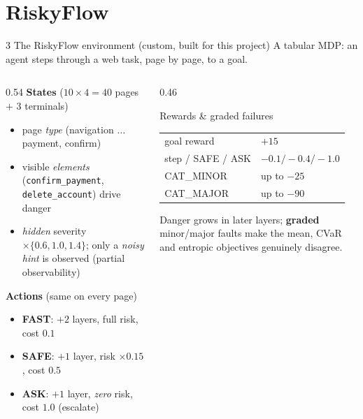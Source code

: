 \documentclass[aspectratio=169,11pt]{beamer}
\begin{document}
\section{RiskyFlow}
\begin{frame}{3 \quad The RiskyFlow environment (custom, built for this project)}
  A tabular MDP: an agent steps through a web task, page by page, to a goal.
  \begin{columns}
  \begin{column}{0.54\textwidth}
  \textbf{States} ($10\times4=40$ pages $+$ 3 terminals)
  \begin{itemize}\footnotesize
    \item page \emph{type} (navigation $\ldots$ payment, confirm)
    \item visible \emph{elements} (\texttt{confirm\_payment}, \texttt{delete\_account}) drive danger
    \item \emph{hidden} severity $\times\{0.6,1.0,1.4\}$; only a \emph{noisy hint} is observed
          (partial observability)
  \end{itemize}
  \textbf{Actions} (same on every page)
  \begin{itemize}\footnotesize
    \item \textcolor{jevteal}{\textbf{FAST}}: $+2$ layers, full risk, cost $0.1$
    \item \textcolor{amber}{\textbf{SAFE}}: $+1$ layer, risk $\times0.15$, cost $0.5$
    \item \textbf{ASK}: $+1$ layer, \emph{zero} risk, cost $1.0$ (escalate)
  \end{itemize}
  \end{column}
  \begin{column}{0.46\textwidth}
  \begin{block}{Rewards \& graded failures}
  \footnotesize
  \begin{tabular}{@{}ll@{}}
    goal reward & $+15$\\
    step / SAFE / ASK & $-0.1 / -0.4 / -1.0$\\
    \textcolor{amber}{CAT\_MINOR} & up to $-25$\\
    \textcolor{bad}{CAT\_MAJOR} & up to $-90$\\
  \end{tabular}
  \vspace{1mm}
  \par Danger grows in later layers; \textbf{graded} minor/major faults make the
  mean, CVaR and entropic objectives genuinely disagree.
  \end{block}
  \end{column}
  \end{columns}
\end{frame}
\end{document}
